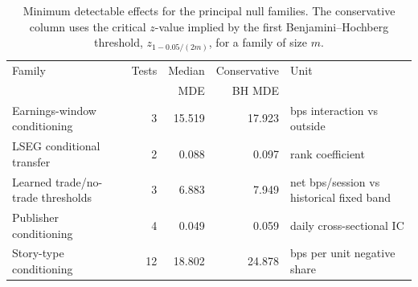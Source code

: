 \begin{table}[htbp]
\centering
\small
\caption[Minimum detectable effects for null families]{Minimum detectable effects for the principal null families. The conservative column uses the critical $z$-value implied by the first Benjamini--Hochberg threshold, $z_{1-0.05/(2m)}$, for a family of size $m$.}
\label{tab:null-mde}
\begin{tabular}{@{}>{\raggedright\arraybackslash}p{3.9cm} d{2.0} d{2.3} d{2.3} >{\raggedright\arraybackslash}p{3.9cm}@{}}
\toprule
Family & {Tests} & {Median} & {Conservative} & Unit \\
 & & {MDE} & {BH MDE} & \\
\midrule
Earnings-window conditioning & 3 & 15.519 & 17.923 & bps interaction vs outside \\
LSEG conditional transfer & 2 & 0.088 & 0.097 & rank coefficient \\
Learned trade/no-trade thresholds & 3 & 6.883 & 7.949 & net bps/session vs historical fixed band \\
Publisher conditioning & 4 & 0.049 & 0.059 & daily cross-sectional IC \\
Story-type conditioning & 12 & 18.802 & 24.878 & bps per unit negative share \\
\bottomrule
\end{tabular}
\end{table}

